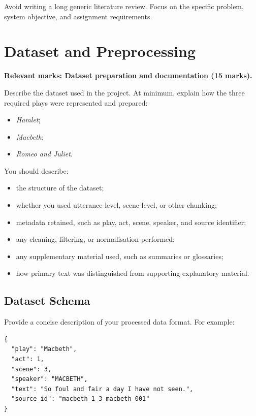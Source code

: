 \documentclass[10pt,conference]{IEEEtran}
\begin{document}
Avoid writing a long generic literature review. 
Focus on the specific problem, system objective, and assignment requirements.

\section{Dataset and Preprocessing}
\label{sec:dataset}

\textbf{Relevant marks: Dataset preparation and documentation (15 marks).}

Describe the dataset used in the project. 
At minimum, explain how the three required plays were represented and prepared:

\begin{itemize}
    \item \textit{Hamlet};
    \item \textit{Macbeth};
    \item \textit{Romeo and Juliet}.
\end{itemize}

You should describe:

\begin{itemize}
    \item the structure of the dataset;
    \item whether you used utterance-level, scene-level, or other chunking;
    \item metadata retained, such as play, act, scene, speaker, and source identifier;
    \item any cleaning, filtering, or normalisation performed;
    \item any supplementary material used, such as summaries or glossaries;
    \item how primary text was distinguished from supporting explanatory material.
\end{itemize}

\subsection{Dataset Schema}

Provide a concise description of your processed data format. 
For example:

\begin{lstlisting}
{
  "play": "Macbeth",
  "act": 1,
  "scene": 3,
  "speaker": "MACBETH",
  "text": "So foul and fair a day I have not seen.",
  "source_id": "macbeth_1_3_macbeth_001"
}
\end{lstlisting}
\end{document}
